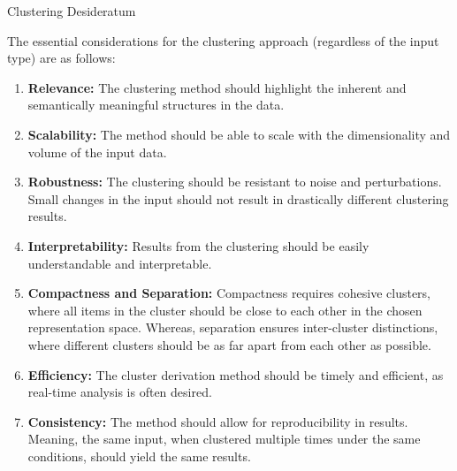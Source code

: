 \begin{Desideratum}{Clustering Desideratum}

The essential considerations for the clustering approach (regardless of the input type) are as follows:
\begin{enumerate}
    \item \textbf{Relevance:} The clustering method should  highlight the inherent and semantically meaningful structures in the data.
    \item \textbf{Scalability:} The method should be able to scale with the dimensionality and volume of the input data.
    \item \textbf{Robustness:} The clustering should be resistant to noise and perturbations. Small changes in the input should not result in drastically different clustering results.
    \item \textbf{Interpretability:} Results from the clustering should be easily understandable and interpretable.
    \item \textbf{Compactness and Separation:} Compactness requires cohesive clusters, where all items in the cluster should be close to each other in the chosen representation space. Whereas, separation ensures inter-cluster distinctions, where different clusters should be as far apart from each other as possible.
    \item \textbf{Efficiency:} The cluster derivation method should be timely and efficient, as real-time analysis is often desired.
    \item \textbf{Consistency:} The method should allow for reproducibility in results. Meaning, the same input, when clustered multiple times under the same conditions, should yield the same results.
    
\end{enumerate}  
\end{Desideratum}



